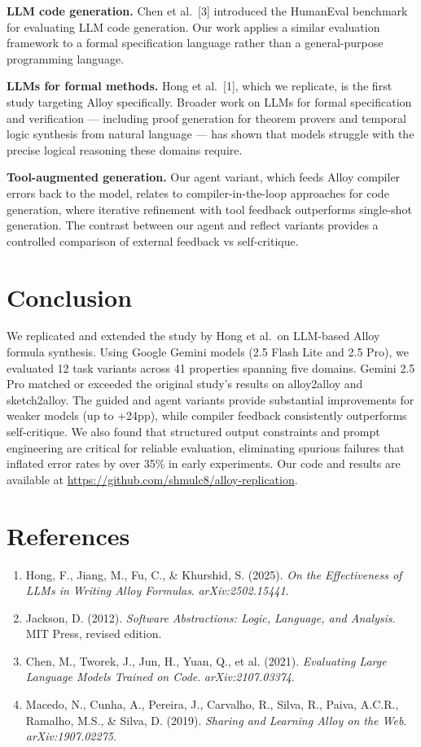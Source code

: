\documentclass[11pt]{article}
\begin{document}
\textbf{LLM code generation.} Chen et al.\ [3] introduced the HumanEval benchmark for evaluating LLM code generation. Our work applies a similar evaluation framework to a formal specification language rather than a general-purpose programming language.

\textbf{LLMs for formal methods.} Hong et al.\ [1], which we replicate, is the first study targeting Alloy specifically. Broader work on LLMs for formal specification and verification --- including proof generation for theorem provers and temporal logic synthesis from natural language --- has shown that models struggle with the precise logical reasoning these domains require.

\textbf{Tool-augmented generation.} Our agent variant, which feeds Alloy compiler errors back to the model, relates to compiler-in-the-loop approaches for code generation, where iterative refinement with tool feedback outperforms single-shot generation. The contrast between our agent and reflect variants provides a controlled comparison of external feedback vs self-critique.

\section{Conclusion}

We replicated and extended the study by Hong et al.\ on LLM-based Alloy formula synthesis. Using Google Gemini models (2.5 Flash Lite and 2.5 Pro), we evaluated 12 task variants across 41 properties spanning five domains. Gemini 2.5 Pro matched or exceeded the original study's results on alloy2alloy and sketch2alloy. The guided and agent variants provide substantial improvements for weaker models (up to +24pp), while compiler feedback consistently outperforms self-critique. We also found that structured output constraints and prompt engineering are critical for reliable evaluation, eliminating spurious failures that inflated error rates by over 35\% in early experiments. Our code and results are available at \url{https://github.com/shmulc8/alloy-replication}.

\section*{References}

\begin{enumerate}
  \item Hong, F., Jiang, M., Fu, C., \& Khurshid, S. (2025). \emph{On the Effectiveness of LLMs in Writing Alloy Formulas}. \emph{arXiv:2502.15441}.
  \item Jackson, D. (2012). \emph{Software Abstractions: Logic, Language, and Analysis}. MIT Press, revised edition.
  \item Chen, M., Tworek, J., Jun, H., Yuan, Q., et al. (2021). \emph{Evaluating Large Language Models Trained on Code}. \emph{arXiv:2107.03374}.
  \item Macedo, N., Cunha, A., Pereira, J., Carvalho, R., Silva, R., Paiva, A.C.R., Ramalho, M.S., \& Silva, D. (2019). \emph{Sharing and Learning Alloy on the Web}. \emph{arXiv:1907.02275}.
\end{enumerate}
\end{document}
